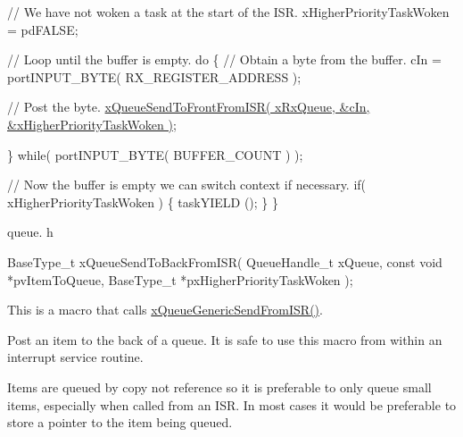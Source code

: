 \begin{DoxyPre} // We have not woken a task at the start of the ISR.
 xHigherPriorityTaskWoken = pdFALSE;\end{DoxyPre}



\begin{DoxyPre} // Loop until the buffer is empty.
 do
 \{
     // Obtain a byte from the buffer.
     cIn = portINPUT\_BYTE( RX\_REGISTER\_ADDRESS );\end{DoxyPre}



\begin{DoxyPre}     // Post the byte.
     \hyperlink{vendor_2ceedling_2plugins_2freertos_2src_2freertos_2include_2queue_8h_af03b83396462affe9e28302660e7b9c6}{xQueueSendToFrontFromISR( xRxQueue, &cIn, &xHigherPriorityTaskWoken )};\end{DoxyPre}



\begin{DoxyPre} \} while( portINPUT\_BYTE( BUFFER\_COUNT ) );\end{DoxyPre}



\begin{DoxyPre} // Now the buffer is empty we can switch context if necessary.
 if( xHigherPriorityTaskWoken )
 \{
     taskYIELD ();
 \}
\}
\end{DoxyPre}


queue. h 
\begin{DoxyPre}
BaseType\_t xQueueSendToBackFromISR(
                                      QueueHandle\_t xQueue,
                                      const void *pvItemToQueue,
                                      BaseType\_t *pxHigherPriorityTaskWoken
                                   );
\end{DoxyPre}


This is a macro that calls \hyperlink{externals_2freertos_2include_2queue_8h_a263711eb0124112e828a18fd4b8ab29d}{x\+Queue\+Generic\+Send\+From\+I\+S\+R()}.

Post an item to the back of a queue. It is safe to use this macro from within an interrupt service routine.

Items are queued by copy not reference so it is preferable to only queue small items, especially when called from an I\+SR. In most cases it would be preferable to store a pointer to the item being queued.


